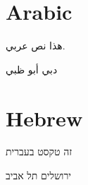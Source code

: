 \documentclass[a4paper]{article}
\begin{document}
\section{Arabic}
\begin{Arabic}%

هذا نص عربي.

دبي
أبو ظبي

\end{Arabic}

\section{Hebrew}
\begin{hebrew}



זה טקסט בעברית

ירושלים
תל אביב

\end{hebrew}


\printindex
\end{document}

